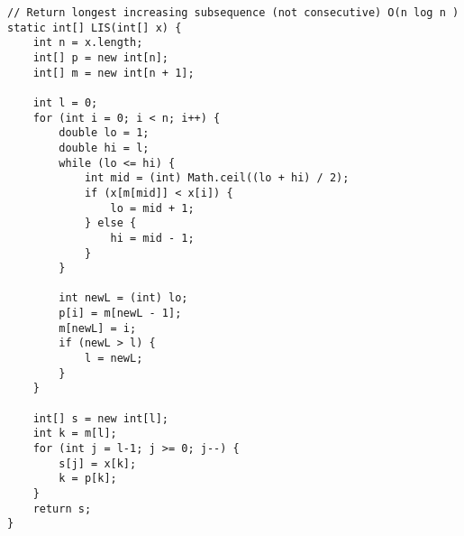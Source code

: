 \begin{verbatim}
// Return longest increasing subsequence (not consecutive) O(n log n )
static int[] LIS(int[] x) {
	int n = x.length;
	int[] p = new int[n];
	int[] m = new int[n + 1];

	int l = 0;
	for (int i = 0; i < n; i++) {
		double lo = 1;
		double hi = l;
		while (lo <= hi) {
			int mid = (int) Math.ceil((lo + hi) / 2);
			if (x[m[mid]] < x[i]) {
				lo = mid + 1;
			} else {
				hi = mid - 1;
			}
		}
		
        int newL = (int) lo;
		p[i] = m[newL - 1];
		m[newL] = i;
		if (newL > l) {
			l = newL;
		}
	}
		
	int[] s = new int[l];
	int k = m[l];
	for (int j = l-1; j >= 0; j--) {
		s[j] = x[k];
		k = p[k];
	}
	return s;
}
\end{verbatim}